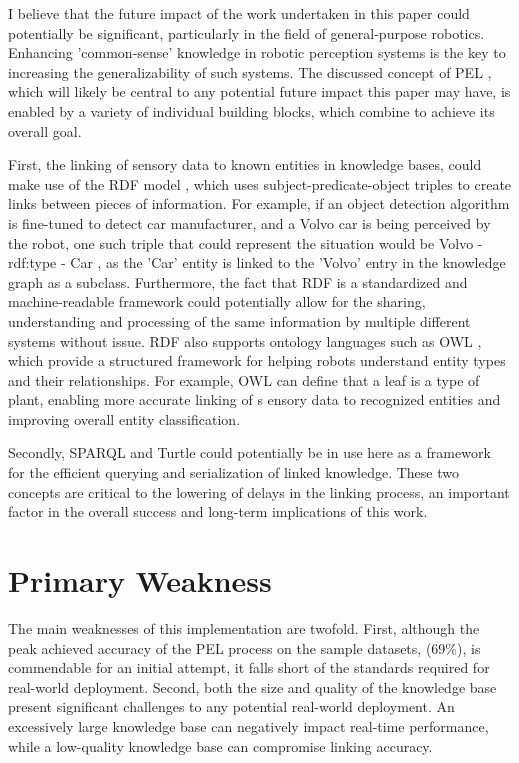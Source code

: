 \documentclass[a4paper,9pt]{scrartcl}
\begin{document}
I believe that the future impact of the work undertaken in this paper could potentially be significant, particularly in the field of general-purpose robotics. 
Enhancing 'common-sense' knowledge in robotic perception systems is the key to increasing the generalizability of such systems. The discussed concept of PEL \cite{adamikAdvancingRoboticPerception2024}, which will likely be 
central to any potential future impact this paper may have, is enabled by a variety of individual building blocks, which combine to achieve its overall goal. 

First, the linking of sensory data to known entities in knowledge bases, could make use of the RDF model \cite{ResourceDescriptionFramework}, which uses subject-predicate-object triples to create
links between pieces of information. For example, if an object detection algorithm is fine-tuned to detect car manufacturer, and a Volvo car is being perceived by the robot, one such triple that could represent the situation would be Volvo - rdf:type - Car
, as the 'Car' entity is linked to the 'Volvo' entry in the knowledge graph as a subclass. Furthermore, the fact that RDF is a standardized and machine-readable framework could potentially 
allow for the sharing, understanding and processing of the same information by multiple different systems without issue. RDF also supports ontology languages such as OWL \cite{WebOntologyLanguage}, 
which provide a structured framework for helping robots understand entity types and their relationships. For example, OWL can define that a leaf is a type of plant, enabling more accurate linking of s
ensory data to recognized entities and improving overall entity classification.


Secondly, SPARQL \cite{SPARQL11Query} and Turtle \cite{RDF11Turtle} could potentially be in use here as a framework for the efficient querying and serialization of linked knowledge. These two concepts are 
critical to the lowering of delays in the linking process, an important factor in the overall success and long-term implications of this work. 



\section{Primary Weakness}

The main weaknesses of this implementation are twofold. First, although the peak achieved accuracy of the PEL process on the sample datasets, (69\%), is 
commendable for an initial attempt, it falls short of the standards required for real-world deployment. Second, both the size and quality of the knowledge 
base present significant challenges to any potential real-world deployment. An excessively large knowledge base can negatively impact real-time performance, while a low-quality knowledge base 
can compromise linking accuracy.
\end{document}
